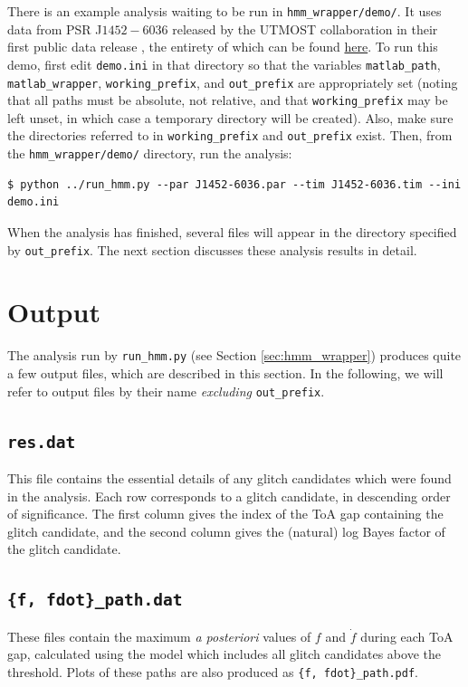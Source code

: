 \documentclass{article}
\begin{document}
There is an example analysis waiting to be run in \texttt{hmm\_wrapper/demo/}. It uses data from {PSR J${1452-6036}$} released by the UTMOST collaboration in their first public data release \citep{LowerBailes2020}, the entirety of which can be found \href{https://github.com/Molonglo/TimingDataRelease1}{here}.
To run this demo, first edit \texttt{demo.ini} in that directory so that the variables \texttt{matlab\_path}, \texttt{matlab\_wrapper}, \texttt{working\_prefix}, and \texttt{out\_prefix} are appropriately set (noting that all paths must be absolute, not relative, and that \texttt{working\_prefix} may be left unset, in which case a temporary directory will be created).
Also, make sure the directories referred to in \texttt{working\_prefix} and \texttt{out\_prefix} exist.
Then, from the \texttt{hmm\_wrapper/demo/} directory, run the analysis:
\begin{lstlisting}
$ python ../run_hmm.py --par J1452-6036.par --tim J1452-6036.tim --ini demo.ini
\end{lstlisting}
When the analysis has finished, several files will appear in the directory specified by \texttt{out\_prefix}.
The next section discusses these analysis results in detail.
\section{Output}
The analysis run by \texttt{run\_hmm.py} (see Section \ref{sec:hmm_wrapper}) produces quite a few output files, which are described in this section.
In the following, we will refer to output files by their name \emph{excluding} \texttt{out\_prefix}.

\subsection{\texttt{res.dat}}
This file contains the essential details of any glitch candidates which were found in the analysis.
Each row corresponds to a glitch candidate, in descending order of significance.
The first column gives the index of the ToA gap containing the glitch candidate, and the second column gives the (natural) log Bayes factor of the glitch candidate.

\subsection{\texttt{\{f, fdot\}\_path.dat}}
These files contain  the maximum \emph{a posteriori} values of $f$ and $\dot{f}$ during each ToA gap, calculated using the model which includes all glitch candidates above the threshold.
Plots of these paths are also produced as \texttt{\{f, fdot\}\_path.pdf}.
\end{document}
